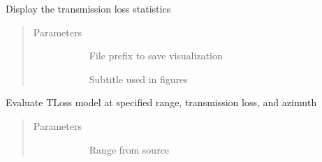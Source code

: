 \documentclass[letterpaper,10pt,english]{sphinxmanual}
\begin{document}
\begin{fulllineitems}
\begin{fulllineitems}
\end{fulllineitems}


\begin{fulllineitems}
\label{\detokenize{stochprop.propagation:stochprop.propagation.TLossModel.display}}
\sphinxAtStartPar
Display the transmission loss statistics
\begin{quote}\begin{description}
\item[{Parameters}] \leavevmode\begin{description}
\item[{}] \leavevmode
\sphinxAtStartPar
File prefix to save visualization

\item[{}] \leavevmode
\sphinxAtStartPar
Subtitle used in figures

\end{description}

\end{description}\end{quote}

\end{fulllineitems}


\begin{fulllineitems}
\label{\detokenize{stochprop.propagation:stochprop.propagation.TLossModel.eval}}
\sphinxAtStartPar
Evaluate TLoss model at specified range, transmission loss, and azimuth
\begin{quote}\begin{description}
\item[{Parameters}] \leavevmode\begin{description}
\item[{}] \leavevmode
\sphinxAtStartPar
Range from source


\end{description}
\end{description}
\end{quote}
\end{fulllineitems}
\end{fulllineitems}
\end{document}
